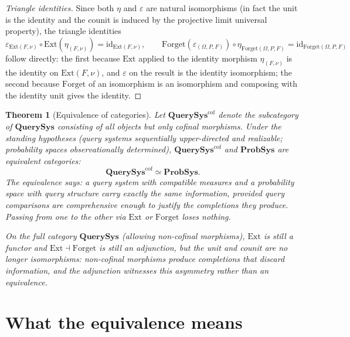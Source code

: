 \documentclass[11pt]{article}
\newtheorem{theorem}{Theorem}
\newcommand{\QSys}{\mathbf{QuerySys}}
\newcommand{\PSys}{\mathbf{ProbSys}}
\newcommand{\id}{\mathrm{id}}
\newcommand{\Ext}{\mathrm{Ext}}
\newcommand{\Forget}{\mathrm{Forget}}
\begin{document}
\begin{proof}[Triangle identities]
Since both $\eta$ and $\varepsilon$ are natural isomorphisms (in fact
the unit is the identity and the counit is induced by the projective limit
universal property), the triangle identities
\[
  \varepsilon_{\Ext(F,\nu)} \circ \Ext(\eta_{(F,\nu)}) = \id_{\Ext(F,\nu)},
  \qquad
  \Forget(\varepsilon_{(\Omega,P,F)}) \circ \eta_{\Forget(\Omega,P,F)}
  = \id_{\Forget(\Omega,P,F)}
\]
follow directly: the first because $\Ext$ applied to the identity morphism
$\eta_{(F,\nu)}$ is the identity on $\Ext(F,\nu)$, and $\varepsilon$ on
the result is the identity isomorphism; the second because $\Forget$ of an
isomorphism is an isomorphism and composing with the identity unit gives
the identity.
\end{proof}

\begin{theorem}[Equivalence of categories]\label{thm:equivalence}
Let $\QSys^{\mathrm{cof}}$ denote the subcategory of $\QSys$ consisting of
all objects but only \emph{cofinal} morphisms.  Under the standing hypotheses
(query systems sequentially upper-directed and realizable; probability spaces
observationally determined), $\QSys^{\mathrm{cof}}$ and $\PSys$ are equivalent
categories:
\[
  \QSys^{\mathrm{cof}} \simeq \PSys.
\]
The equivalence says: \emph{a query system with compatible measures and a
probability space with query structure carry exactly the same information,
provided query comparisons are comprehensive enough to justify the
completions they produce.}  Passing from one to the other via $\Ext$ or
$\Forget$ loses nothing.

On the full category $\QSys$ (allowing non-cofinal morphisms), $\Ext$ is
still a functor and $\Ext \dashv \Forget$ is still an adjunction, but the
unit and counit are no longer isomorphisms: non-cofinal morphisms produce
completions that discard information, and the adjunction witnesses this
asymmetry rather than an equivalence.
\end{theorem}

\section{What the equivalence means}
\label{sec:meaning}
\end{document}
